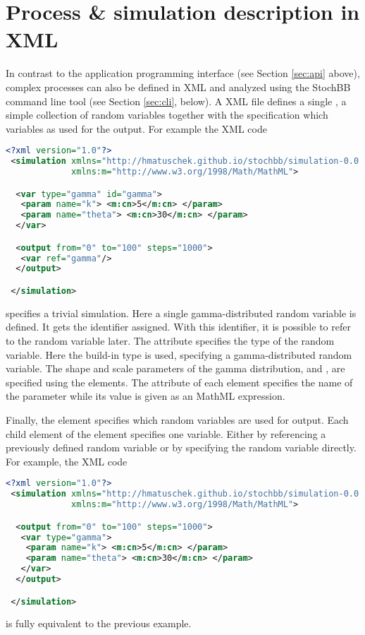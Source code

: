\section{Process \& simulation description in XML} \label{sec:xml}
In contrast to the application programming interface (see Section \ref{sec:api} above), 
complex processes can also be defined in XML and analyzed using the
StochBB command line tool (see Section \ref{sec:cli}, below). A XML file defines a single 
, a simple collection of random variables together with the specification which
variables as used for the output. For example the XML code
\begin{lstlisting}[language=XML]
 <?xml version="1.0"?>
 <simulation xmlns="http://hmatuschek.github.io/stochbb/simulation-0.0.dtd"
             xmlns:m="http://www.w3.org/1998/Math/MathML">

  <var type="gamma" id="gamma">
   <param name="k"> <m:cn>5</m:cn> </param>
   <param name="theta"> <m:cn>30</m:cn> </param>
  </var>

  <output from="0" to="100" steps="1000">
   <var ref="gamma"/>
  </output>

 </simulation>
\end{lstlisting}
specifies a trivial simulation. Here a single gamma-distributed random variable is defined.
It gets the identifier  assigned. With this identifier, it is possible to refer to the random
variable later. The  attribute specifies the type of the random variable. Here the
build-in type  is used, specifying a gamma-distributed random variable. The shape and
scale parameters of the gamma distribution,  and , are specified using the  elements. 
The  attribute of each  element specifies the name of the parameter while 
its value is given as an MathML expression.

Finally, the  element specifies which random variables are used for output. Each child
element of the  element specifies one variable. Either by referencing a previously defined
random variable or by specifying the random variable directly. For example, the XML code
\begin{lstlisting}[language=XML]
 <?xml version="1.0"?>
 <simulation xmlns="http://hmatuschek.github.io/stochbb/simulation-0.0.dtd"
             xmlns:m="http://www.w3.org/1998/Math/MathML">

  <output from="0" to="100" steps="1000">
   <var type="gamma">
    <param name="k"> <m:cn>5</m:cn> </param>
    <param name="theta"> <m:cn>30</m:cn> </param>
   </var>
  </output>

 </simulation>
\end{lstlisting}
is fully equivalent to the previous example.

